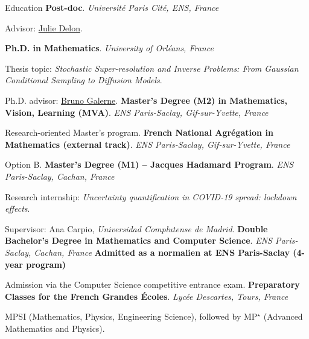 \begin{rubric}{Education}
\entry*[2025 -- Present]%
\textbf{Post-doc}. \emph{Université Paris Cité, ENS, France}
\par Advisor: \href{https://judelo.github.io}{Julie Delon}.

\entry*[2022 -- 2025]%
\textbf{Ph.D. in Mathematics}. \emph{University of Orléans, France}
\par Thesis topic: \emph{Stochastic Super-resolution and Inverse Problems: From Gaussian Conditional Sampling to Diffusion Models}.
\par Ph.D. advisor: \href{https://www.idpoisson.fr/galerne/}{Bruno Galerne}.
%
\entry*[2021 -- 2022]%
\textbf{Master’s Degree (M2) in Mathematics, Vision, Learning (MVA)}. \emph{ENS Paris-Saclay, Gif-sur-Yvette, France}
\par Research-oriented Master’s program.
%
\entry*[2020 -- 2021]%
\textbf{French National Agrégation in Mathematics (external track)}. \emph{ENS Paris-Saclay, Gif-sur-Yvette, France}
\par Option B.
%
\entry*[2019 -- 2020]%
\textbf{Master’s Degree (M1) – Jacques Hadamard Program}. \emph{ENS Paris-Saclay, Cachan, France}
\par Research internship: \emph{Uncertainty quantification in COVID-19 spread: lockdown effects}.
\par Supervisor: Ana Carpio, \emph{Universidad Complutense de Madrid}.
%
\entry*[2018 -- 2019]%
\textbf{Double Bachelor’s Degree in Mathematics and Computer Science}. \emph{ENS Paris-Saclay, Cachan, France}
%
\entry*[2018]%
\textbf{Admitted as a normalien at ENS Paris-Saclay (4-year program)}
\par Admission via the Computer Science competitive entrance exam.
%
\entry*[2015 -- 2018]%
\textbf{Preparatory Classes for the French Grandes Écoles}. \emph{Lycée Descartes, Tours, France}
\par MPSI (Mathematics, Physics, Engineering Science), followed by MP$^\star$ (Advanced Mathematics and Physics).
\end{rubric}